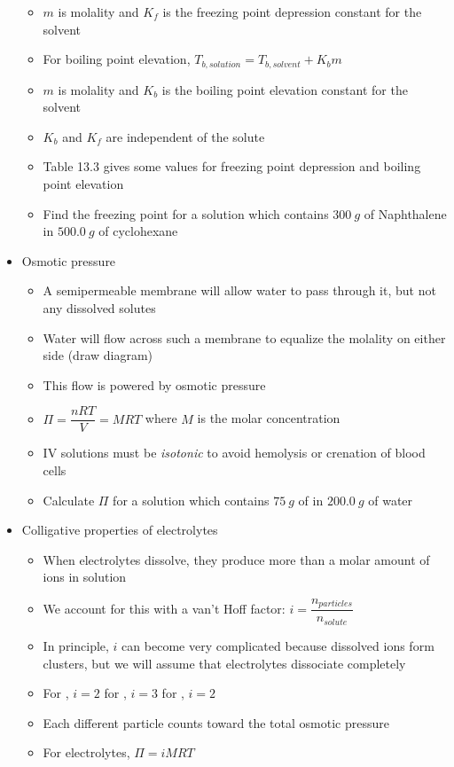 \documentclass[12pt, openany, letterpaper]{memoir}
\begin{document}
\begin{itemize}
\begin{itemize}
		\item $m$ is molality and $K_f$ is the freezing point depression constant for the solvent
		\item For boiling point elevation, $T_{b,solution}=T_{b,solvent}+K_bm$
		\item $m$ is molality and $K_b$ is the boiling point elevation constant for the solvent
		\item $K_b$ and $K_f$ are independent of the solute
		\item Table 13.3 gives some values for freezing point depression and boiling point elevation
		\item Find the freezing point for a solution which contains $300~g$ of Naphthalene in $500.0~g$ of cyclohexane
	\end{itemize}
	\item Osmotic pressure
	\begin{itemize}
		\item A semipermeable membrane will allow water to pass through it, but not any dissolved solutes
		\item Water will flow across such a membrane to equalize the molality on either side (draw diagram)
		\item This flow is powered by osmotic pressure
		\item $\Pi = \dfrac{nRT}{V}=MRT$ where $M$ is the molar concentration
		\item IV solutions must be \emph{isotonic} to avoid hemolysis or crenation of blood cells
		\item Calculate $\Pi$ for a solution which contains $75~g$ of  in $200.0~g$ of water
	\end{itemize}
\item Colligative properties of electrolytes
  \begin{itemize}
    \item When electrolytes dissolve, they produce more than a molar amount of ions in solution
    \item We account for this with a van't Hoff factor: $i=\dfrac{n_{particles}}{n_{solute}}$
    \item In principle, $i$ can become very complicated because dissolved ions form clusters, but we will assume that electrolytes dissociate completely
    \item For , $i=2$ \hspace{2em} for , $i=3$ \hspace{2em} for , $i=2$
    \item Each different particle counts toward the total osmotic pressure
    \item For electrolytes, $\Pi=iMRT$
  \end{itemize}
\end{itemize}
\end{document}
